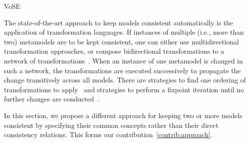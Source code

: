 \begin{copiedFrom}{VoSE}

The state-of-the-art approach to keep models consistent automatically is the application of transformation languages.
If instances of multiple (i.e., more than two) metamodels are to be kept consistent, one can either use multidirectional transformation approaches, or compose bidirectional transformations to a network of transformations~\cite{cleve2019dagstuhl}.
When an instance of one metamodel is changed in such a network, the transformations are executed successively to propagate the change transitively across all models.
There are strategies to find one ordering of transformations to apply~\cite{stevens2020BidirectionalTransformationLarge-SoSym} and strategies to perform a fixpoint iteration until no further changes are conducted~\cite{klare2019icmt}.

In this section, we propose a different approach for keeping two or more models consistent by specifying their common concepts rather than their direct consistency relations.
This forms our contribution~\ref{contrib:approach}.




\end{copiedFrom}
